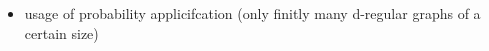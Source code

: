 \begin{itemize}
\itemsep1pt\parskip0pt
\item
  usage of probability applicifcation (only finitly many d-regular
  graphs of a certain size)
\end{itemize}



